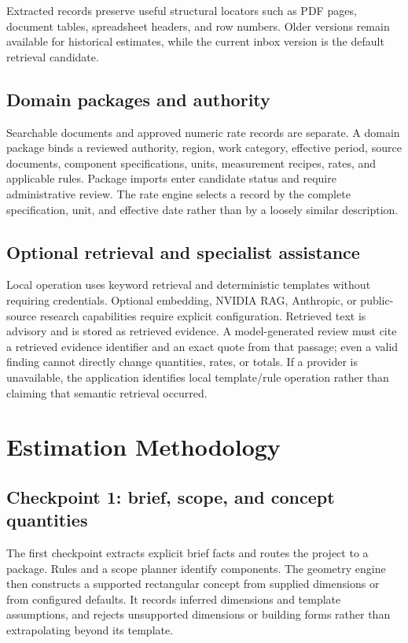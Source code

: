 Extracted records preserve useful structural locators such as PDF pages, document tables, spreadsheet headers, and row numbers. Older versions remain available for historical estimates, while the current inbox version is the default retrieval candidate.

\subsection{Domain packages and authority}
Searchable documents and approved numeric rate records are separate. A domain package binds a reviewed authority, region, work category, effective period, source documents, component specifications, units, measurement recipes, rates, and applicable rules. Package imports enter candidate status and require administrative review. The rate engine selects a record by the complete specification, unit, and effective date rather than by a loosely similar description.

\subsection{Optional retrieval and specialist assistance}
Local operation uses keyword retrieval and deterministic templates without requiring credentials. Optional embedding, NVIDIA RAG, Anthropic, or public-source research capabilities require explicit configuration. Retrieved text is advisory and is stored as retrieved evidence. A model-generated review must cite a retrieved evidence identifier and an exact quote from that passage; even a valid finding cannot directly change quantities, rates, or totals. If a provider is unavailable, the application identifies local template/rule operation rather than claiming that semantic retrieval occurred.

\section{Estimation Methodology}
\subsection{Checkpoint 1: brief, scope, and concept quantities}
The first checkpoint extracts explicit brief facts and routes the project to a package. Rules and a scope planner identify components. The geometry engine then constructs a supported rectangular concept from supplied dimensions or from configured defaults. It records inferred dimensions and template assumptions, and rejects unsupported dimensions or building forms rather than extrapolating beyond its template.

